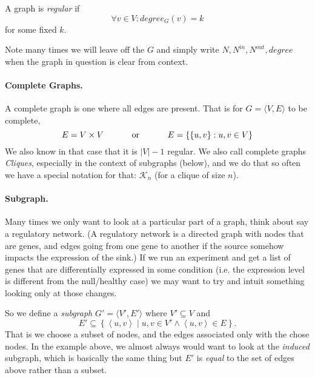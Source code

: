 A graph is \emph{regular} if \[\forall v \in V : degree_G(v) = k\] for some fixed $k$. 

Note many times we will leave off the $G$ and simply write $N,N^{in},N^{out},degree$ when the graph in question is clear from context. 


\paragraph{Complete Graphs.}
A complete graph is one where all edges are present. 
That is for $G=\langle V, E\rangle$ to be complete, 
\[E= V\times V \textnormal{\hspace{3em} or \hspace{3em}} E= \left\{\left\{u,v\right\} : u,v \in V\right\}\]
We also know in that case that it is $|V|-1$ regular.
We also call complete graphs \emph{Cliques}, especially in the context of subgraphs (below), 
and we do that so often we have a special notation for that: $\mathcal{K}_n$ (for a clique of size $n$). 


\paragraph{Subgraph.}
Many times we only want to look at a particular part of a graph, 
think about say a regulatory network.
(A regulatory network is a directed graph with nodes that are genes, 
and edges going from one gene to another if the source somehow impacts the expression of the sink.) 
If we run an experiment and get a list of genes that are differentially expressed in some condition 
(i.e. the expression level is different from the null/healthy case) 
we may want to try and intuit something looking only at those changes. 

So we define a \emph{subgraph} $G' = \langle V', E'\rangle$ where 
$V' \subseteq V$ and \[E' \subseteq \left\{\left\langle u,v\right\rangle \mid u,v\in V'\wedge \left\langle u,v\right\rangle \in E \right\}.\]
That is we choose a subset of nodes, and the edges associated only with the chose nodes. 
In the example above, we almost always would want to look at the \emph{induced} subgraph, which is basically the same thing
but $E'$ is \textit{equal} to the set of edges above rather than a subset.

